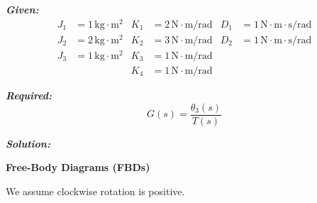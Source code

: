 \documentclass[11pt]{article}
\begin{document}
\noindent\textbf{\textit{Given:}}
\[
\begin{aligned}
J_1 &= 1\, \text{kg}\cdot\text{m}^2 & K_1 &= 2\, \text{N}\cdot\text{m/rad} & D_1 &= 1\, \text{N}\cdot\text{m}\cdot\text{s/rad} \\
J_2 &= 2\, \text{kg}\cdot\text{m}^2 & K_2 &= 3\, \text{N}\cdot\text{m/rad} & D_2 &= 1\, \text{N}\cdot\text{m}\cdot\text{s/rad} \\
J_3 &= 1\, \text{kg}\cdot\text{m}^2 & K_3 &= 1\, \text{N}\cdot\text{m/rad} & & \\
& & K_4 &= 1\, \text{N}\cdot\text{m/rad} & & 
\end{aligned}
\]

\vspace{12pt}

\noindent \textbf{\textit{Required:}}
\[
G(s) = \frac{\theta_3(s)}{T(s)}
\]

\vspace{12pt}

\noindent \textbf{\textit{Solution:}}

\vspace{12pt}

\noindent\textbf{Free-Body Diagrams (FBDs)}

\vspace{12pt}

We assume clockwise rotation is positive.
\end{document}
